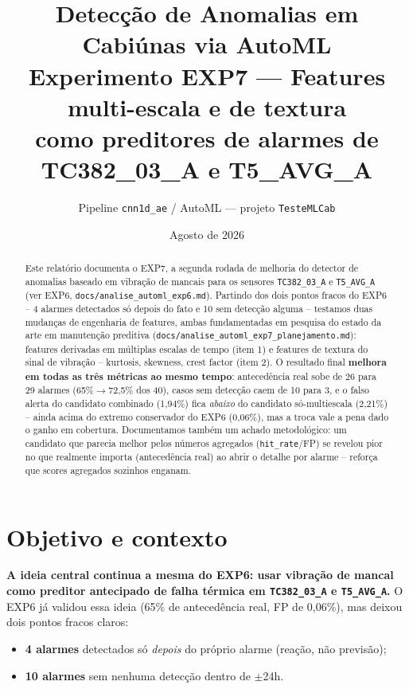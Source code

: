 \documentclass[11pt,a4paper]{article}
\title{Detecção de Anomalias em Cabiúnas via AutoML\\
\large Experimento EXP7 --- Features multi-escala e de textura\\
como preditores de alarmes de TC382\_03\_A e T5\_AVG\_A}
\author{Pipeline \texttt{cnn1d\_ae} / AutoML --- projeto \texttt{TesteMLCab}}
\date{Agosto de 2026}
\begin{document}
\maketitle

\begin{abstract}
Este relatório documenta o EXP7, a segunda rodada de melhoria do detector
de anomalias baseado em vibração de mancais para os sensores
\texttt{TC382\_03\_A} e \texttt{T5\_AVG\_A} (ver EXP6,
\texttt{docs/analise\_automl\_exp6.md}). Partindo dos dois pontos fracos do
EXP6 -- 4 alarmes detectados só depois do fato e 10 sem detecção alguma --
testamos duas mudanças de engenharia de features, ambas fundamentadas em
pesquisa do estado da arte em manutenção preditiva
(\texttt{docs/analise\_automl\_exp7\_planejamento.md}): features derivadas
em múltiplas escalas de tempo (item 1) e features de textura do sinal de
vibração -- kurtosis, skewness, crest factor (item 2). O resultado final
\textbf{melhora em todas as três métricas ao mesmo tempo}: antecedência real
sobe de 26 para 29 alarmes (65\%$\to$72,5\% dos 40), casos sem detecção
caem de 10 para 3, e o falso alerta do candidato combinado (1,94\%) fica
\emph{abaixo} do candidato só-multiescala (2,21\%) -- ainda acima do
extremo conservador do EXP6 (0,06\%), mas a troca vale a pena dado o ganho
em cobertura. Documentamos também um achado metodológico: um candidato que
parecia melhor pelos números agregados (\texttt{hit\_rate}/FP) se revelou
pior no que realmente importa (antecedência real) ao abrir o detalhe por
alarme -- reforça que scores agregados sozinhos enganam.
\end{abstract}

\tableofcontents

\section{Objetivo e contexto}

\textbf{A ideia central continua a mesma do EXP6: usar vibração de mancal
como preditor antecipado de falha térmica em \texttt{TC382\_03\_A} e
\texttt{T5\_AVG\_A}.} O EXP6 já validou essa ideia (65\% de antecedência
real, FP de 0,06\%), mas deixou dois pontos fracos claros:

\begin{itemize}
  \item \textbf{4 alarmes} detectados só \emph{depois} do próprio alarme
        (reação, não previsão);
  \item \textbf{10 alarmes} sem nenhuma detecção dentro de $\pm$24h.
\end{itemize}
\end{document}
